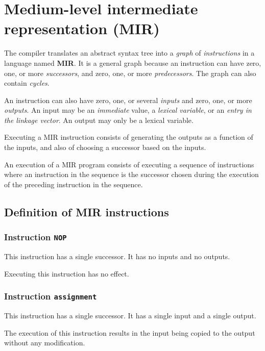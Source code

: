 \chapter{Medium-level intermediate representation (MIR)}

The compiler translates an abstract syntax tree into a \emph{graph} of
\emph{instructions} in a language named \textbf{MIR}.  It is a general
graph because an instruction can have zero, one, or more
\emph{successors}, and zero, one, or more \emph{predecessors}.  The
graph can also contain \emph{cycles}.  

An instruction can also have zero, one, or several \emph{inputs} and
zero, one, or more \emph{outputs}.  An input may be an
\emph{immediate} value, a \emph{lexical variable}, or an \emph{entry
  in the linkage vector}.  An output may only be a lexical variable.

Executing a MIR instruction consists of generating the outputs as a
function of the inputs, and also of choosing a successor based on the
inputs.

An execution of a MIR program consists of executing a sequence of
instructions where an instruction in the sequence is the successor
chosen during the execution of the preceding instruction in the
sequence.

\section{Definition of MIR instructions}

\subsection{Instruction \texttt{NOP}}
\label{mir-instruction-NOP}

This instruction has a single successor.  It has no inputs and no
outputs.

Executing this instruction has no effect. 

\subsection{Instruction \texttt{assignment}}
\label{mir-instruction-assignment}

This instruction has a single successor.  It has a single input and a
single output. 

The execution of this instruction results in the input being copied to
the output without any modification. 

